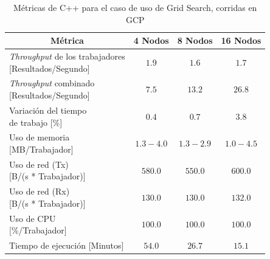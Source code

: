 \documentclass[11pt]{article}
\providecommand{\row}[1]{\parbox{150pt}{\setlength{\baselineskip}{0.2\baselineskip}\strut#1\strut}}
\newcommand{\gscap}[2]{\caption{Métricas de #1 para el caso de uso de Grid Search, corridas en #2}}
\newcommand{\english}[1]{\textit{#1}}
\begin{document}
\begin{table}[H]
\centering
\begin{tabular}{|l|c|c|c|}
\hline
\multicolumn{1}{|c|}{Métrica} & 4 Nodos & 8 Nodos & 16 Nodos \\ \hline
\row{\english{Throughput} de los trabajadores\\{[Resultados/Segundo]}} & $1.9$ & $1.6$ & $1.7$ \\ \hline
\row{\english{Throughput} combinado\\{[Resultados/Segundo]}} & $7.5$ & $13.2$ & $26.8$ \\ \hline
\row{Variación del tiempo\\de trabajo {[\%]}} & $0.4$ & $0.7$ & $3.8$ \\ \hline
\row{Uso de memoria\\{[MB/Trabajador]}} & $1.3-4.0$ & $1.3-2.9$ & $1.0-4.5$ \\ \hline
\row{Uso de red (Tx)\\{[B/(s * Trabajador)]}} & $580.0$ & $550.0$ & $600.0$ \\ \hline
\row{Uso de red (Rx)\\{[B/(s * Trabajador)]}} & $130.0$ & $130.0$ & $132.0$ \\ \hline
\row{Uso de CPU\\{[\%/Trabajador]}} & $100.0$ & $100.0$ & $100.0$ \\ \hline
Tiempo de ejecución [Minutos] & $54.0$ & $26.7$ & $15.1$ \\ \hline
\end{tabular}
\gscap{C++}{GCP}
\end{table}
\end{document}
